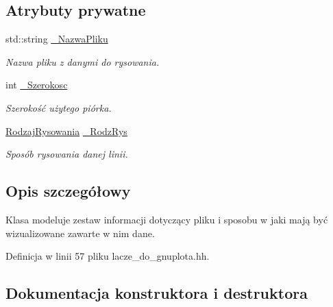 \subsection*{Atrybuty prywatne}
\begin{DoxyCompactItemize}
\item 
std\+::string \mbox{\hyperlink{class_pz_g_1_1_info_pliku_do_rysowania_a07ab06c56b9c3179e566a4123ab2a037}{\+\_\+\+Nazwa\+Pliku}}
\begin{DoxyCompactList}\small\item\em Nazwa pliku z danymi do rysowania. \end{DoxyCompactList}\item 
int \mbox{\hyperlink{class_pz_g_1_1_info_pliku_do_rysowania_a56a03dde7a7a414dbf3c230812a8d741}{\+\_\+\+Szerokosc}}
\begin{DoxyCompactList}\small\item\em Szerokość użytego piórka. \end{DoxyCompactList}\item 
\mbox{\hyperlink{namespace_pz_g_a705c92106f39b7d0c34a6739d10ff0b6}{Rodzaj\+Rysowania}} \mbox{\hyperlink{class_pz_g_1_1_info_pliku_do_rysowania_ac2512f2073c66164beb2e88db31344a4}{\+\_\+\+Rodz\+Rys}}
\begin{DoxyCompactList}\small\item\em Sposób rysowania danej linii. \end{DoxyCompactList}\end{DoxyCompactItemize}


\subsection{Opis szczegółowy}
Klasa modeluje zestaw informacji dotyczący pliku i sposobu w jaki mają być wizualizowane zawarte w nim dane. 

Definicja w linii 57 pliku lacze\+\_\+do\+\_\+gnuplota.\+hh.



\subsection{Dokumentacja konstruktora i destruktora}
\mbox{\label{class_pz_g_1_1_info_pliku_do_rysowania_a48bc8ad94ef5fd5120b668a566c9172e}} 
